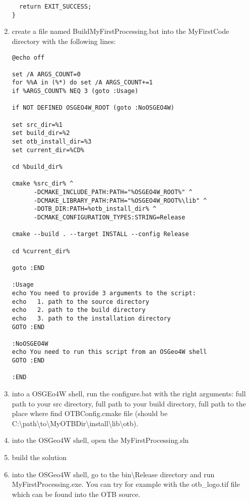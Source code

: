 \begin{enumerate}
\begin{verbatim}
  return EXIT_SUCCESS;
}
\end{verbatim}
\item create a file named BuildMyFirstProcessing.bat into the MyFirstCode directory with the following lines:
\begin{verbatim}
@echo off

set /A ARGS_COUNT=0    
for %%A in (%*) do set /A ARGS_COUNT+=1  
if %ARGS_COUNT% NEQ 3 (goto :Usage)

if NOT DEFINED OSGEO4W_ROOT (goto :NoOSGEO4W)
	
set src_dir=%1
set build_dir=%2
set otb_install_dir=%3 
set current_dir=%CD%

cd %build_dir%

cmake %src_dir% ^
      -DCMAKE_INCLUDE_PATH:PATH="%OSGEO4W_ROOT%" ^
      -DCMAKE_LIBRARY_PATH:PATH="%OSGEO4W_ROOT%\lib" ^
      -DOTB_DIR:PATH=%otb_install_dir% ^
      -DCMAKE_CONFIGURATION_TYPES:STRING=Release

cmake --build . --target INSTALL --config Release

cd %current_dir%

goto :END

:Usage
echo You need to provide 3 arguments to the script: 
echo   1. path to the source directory
echo   2. path to the build directory
echo   3. path to the installation directory 
GOTO :END

:NoOSGEO4W
echo You need to run this script from an OSGeo4W shell
GOTO :END

:END
\end{verbatim}
\item into a OSGEo4W shell, run the configure.bat with the right arguments: full path to your src directory, full path to your build directory, full path to the place where find OTBConfig.cmake file (should be C:\textbackslash path\textbackslash to\textbackslash MyOTBDir\textbackslash install\textbackslash lib\textbackslash otb).
\item into the OSGeo4W shell, open the MyFirstProcessing.sln
\item build the solution
\item into the OSGeo4W shell, go to the bin\textbackslash Release directory and run MyFirstProcessing.exe. You can try for example with the otb\_logo.tif file which can be found into the OTB source.
\end{enumerate}
